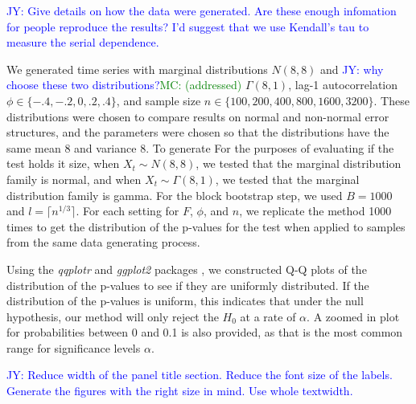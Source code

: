 \documentclass[12pt, titlepage, letterpaper]{article}
\newcommand{\jy}[1]{\textcolor{blue}{JY: #1}}
\newcommand{\mc}[1]{\textcolor{green}{MC: (#1)}}
\begin{document}
{\jy{Give details on how the data were generated. Are these enough infomation for
  people reproduce the results? I'd suggest that we use Kendall's tau to measure
  the serial dependence. }


We generated time series with marginal distributions $N(8, 8)$ and
\jy{why choose these two distributions?}\mc{addressed}
$\Gamma(8, 1)$, lag-1 autocorrelation $\phi \in \{-.4, -.2, 0, .2, .4\}$, and
sample size $n \in \{100, 200, 400, 800, 1600, 3200\}$. These distributions
were chosen to compare results on normal and non-normal
error structures, and the parameters were chosen so that the distributions
have the same mean 8 and variance 8. To generate 
For the purposes of 
evaluating if the test holds it size, when $X_t \sim N(8, 8)$, we tested that the 
marginal distribution family is normal, and when $X_t \sim \Gamma(8, 1)$, we tested
that the marginal distribution family is gamma. For the block bootstrap step,
we used $B = 1000$ and $l = \lceil n^{1/3} \rceil$.
For each setting for $F$, $\phi$, and $n$, we replicate the method 1000 times 
to get the distribution of the p-values 
for the test when applied to samples from the same data generating process.


Using the \textsl{qqplotr} and \textsl{ggplot2} packages 
\citep{qqplotr, ggplot2},
we constructed Q-Q plots of the distribution of the p-values to see if they are
uniformly distributed. If the distribution of the p-values is uniform, this 
indicates that under the null hypothesis, our method will only reject the $H_0$
at a rate of $\alpha$.
A zoomed in plot for probabilities between 0 and 0.1 is
also provided, as
that is the most common range for significance levels $\alpha$. 

\jy{Reduce width of  the panel title section. Reduce the font size of the
  labels. Generate the figures with the right size in mind. Use whole textwidth.}
  
}
\end{document}

